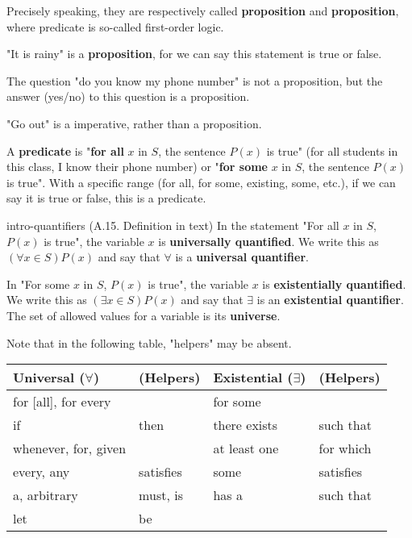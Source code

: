 \documentclass[../src/handouts/main.tex]{subfiles}
\begin{document}
Precisely speaking, they are respectively called \textbf{proposition} and \textbf{proposition}, where predicate is so-called first-order logic.

"It is rainy" is a \textbf{proposition}, for we can say this statement is true or false.

The question "do you know my phone number" is not a proposition, but the answer (yes/no) to this question is a proposition.

"Go out" is a imperative, rather than a proposition.

A \textbf{predicate} is "\textbf{for all} $x$ in $S$, the sentence $P(x)$ is true" (for all students in this class, I know their phone number) or "\textbf{for some} $x$ in $S$, the sentence $P(x)$ is true". With a specific range (for all, for some, existing, some, etc.), if we can say it is true or false, this is a predicate.

\begin{definition}{}{intro-quantifiers}
  (A.15. Definition in text)
  In the statement "For all $x$ in $S$, $P(x)$ is true", the variable $x$ is \textbf{universally quantified}. We write this as $(\forall x \in S) P(x)$ and say that $\forall$ is a \textbf{universal quantifier}.

  In "For some $x$ in $S$, $P(x)$ is true", the variable $x$ is \textbf{existentially quantified}. We write this as $(\exists x \in S) P(x)$ and say that $\exists$ is an \textbf{existential quantifier}. The set of allowed values for a variable is its \textbf{universe}.

  Note that in the following table, "helpers" may be absent.

  \centering
  \begin{tabular}{ll|ll}
    Universal ($\forall$) & (Helpers) & Existential ($\exists$) & (Helpers) \\ \hline
    for [all], for every  &           & for some                &           \\
    if                    & then      & there exists            & such that \\
    whenever, for, given  &           & at least one            & for which \\
    every, any            & satisfies & some                    & satisfies \\
    a, arbitrary          & must, is  & has a                   & such that \\
    let                   & be        &                         &
  \end{tabular}
\end{definition}
\end{document}
